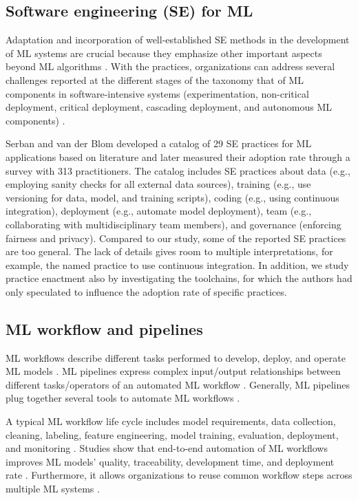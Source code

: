 
\subsection{Software engineering (SE) for ML}
Adaptation and incorporation of well-established SE methods in the development of ML systems are crucial \cite{Amershi2019}because they emphasize other important \DIFaddbegin {}\DIFaddend aspects beyond ML algorithms \cite{Sculley2015}. With the practices, organizations can address several challenges reported at the different stages of the taxonomy that \DIFdelbegin {}\DIFdelend \DIFaddbegin {}\DIFaddend of ML components in software-intensive systems (experimentation, non-critical deployment, critical deployment, cascading deployment, and autonomous ML components) \cite{Lwakatare2019}.

Serban and van der Blom \cite{Serban2020Practices} developed a catalog of 29 SE practices for ML applications based on literature and later measured their adoption rate through a survey with 313 practitioners. The catalog includes SE practices about data (e.g., employing sanity checks for all external data sources), training (e.g., use versioning for data, model, and training scripts), coding (e.g., using continuous integration), deployment (e.g., automate model deployment), team (e.g., collaborating with multidisciplinary team members), and governance (enforcing fairness and privacy). Compared to our study, some of the reported SE practices are too general. The lack of details gives room to multiple interpretations, for example, the named practice to use continuous integration. In addition, we study practice enactment also by investigating the toolchains, for which the authors \cite{Serban2020Practices} had only speculated to influence the adoption rate of specific practices. 

\subsection{ML workflow and pipelines}

ML workflows describe different tasks performed to develop, deploy, and operate ML models  \cite{Amershi2019}. ML pipelines express complex input/output relationships between different tasks/operators of an automated ML workflow \cite{Doris2021MLPipelines}. Generally, ML pipelines plug together several tools to automate ML workflows \cite{Hummer2019IBM}.

A typical ML workflow life cycle includes model requirements, data collection, cleaning, labeling, feature engineering, model training, evaluation, deployment, and monitoring  \cite{Amershi2019}. Studies show that end-to-end automation of ML workflows improves ML models’ quality, traceability, development time, and deployment rate  \cite{Doris2021MLPipelines, Hummer2019IBM}. Furthermore, it allows organizations to reuse common workflow steps across multiple ML systems \cite{Baylor2017, Hummer2019IBM}.

